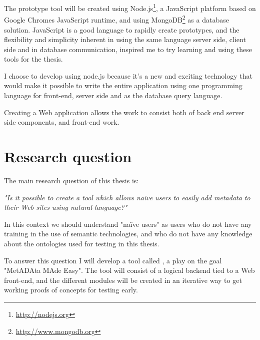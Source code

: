 The prototype tool will be created using Node.js\footnote{\url{http://nodejs.org}},
a JavaScript platform based on Google Chromes JavaScript runtime,
and using MongoDB\footnote{\url{http://www.mongodb.org}} as a database solution.
JavaScript is a good language to rapidly create prototypes, and the flexibility and simplicity inherent in using the same language
server side, client side and in database communication, inspired me to try learning and using these tools for the thesis.

%

I choose to develop using node.js because it's a new and exciting technology that would make it possible to write
the entire application using one programming language for front-end, server side and as the database query language.

Creating a Web application allows the work to consist both of back end server side components, and front-end work.


\section{Research question}
The main research question of this thesis is:

\emph{"Is it possible to create a tool which allows naïve users to easily add metadata to their Web sites using natural language?"}

In this context we should understand "naïve users" as users who do not have any training in the use of semantic technologies,
and who do not have any knowledge about the ontologies used for testing in this thesis.

To answer this question I will develop a tool called \theartefact, a play on the goal "MetADAta MAde Easy".
The tool will consist of a logical backend tied to a Web front-end,
and the different modules will be created in an iterative way to get working proofs of concepts for testing early.

